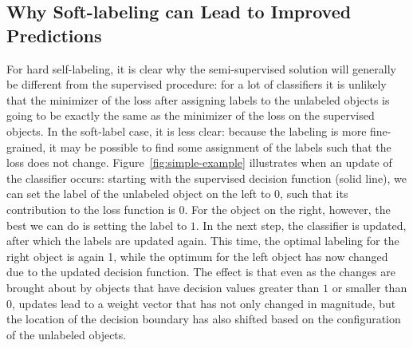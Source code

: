 \documentclass[twoside]{memoir}\usepackage[]{graphicx}\usepackage{xcolor}
\begin{document}
\subsection{Why Soft-labeling can Lead to Improved Predictions}
For hard self-labeling, it is clear why the semi-supervised solution will generally be different from the supervised procedure: for a lot of classifiers it is unlikely that the minimizer of the loss after assigning labels to the unlabeled objects is going to be exactly the same as the minimizer of the loss on the supervised objects. In the soft-label case, it is less clear: because the labeling is more fine-grained, it may be possible to find some assignment of the labels such that the loss does not change. Figure~\ref{fig:simple-example} illustrates when an update of the classifier occurs: starting with the supervised decision function (solid line), we can set the label of the unlabeled object on the left to $0$, such that its contribution to the loss function is $0$. For the object on the right, however, the best we can do is setting the label to $1$. In the next step, the classifier is updated, after which the labels are updated again. This time, the optimal labeling for the right object is again 1, while the optimum for the left object has now changed due to the updated decision function. The effect is that even as the changes are brought about by objects that have decision values greater than $1$ or smaller than $0$, updates lead to a weight vector that has not only changed in magnitude, but the location of the decision boundary has also shifted based on the configuration of the unlabeled objects.
\end{document}
